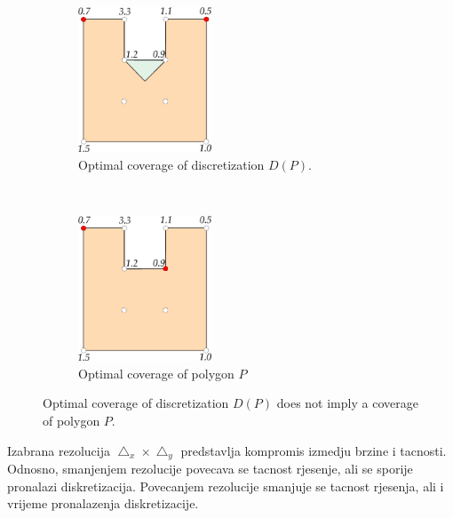 \documentclass[runningheads,a4paper]{elsarticle}
\begin{document}
	\begin{figure}[t!]
    	\centering
    	\begin{subfigure}[t]{0.49\textwidth}
        	\centering
        	\includegraphics[height=1.7in]{slika1a.eps}
        	\caption{Optimal coverage of discretization $D(P)$. }
    	\end{subfigure}%
    	~ 
    	\begin{subfigure}[t]{0.49\textwidth}
        	\centering
        	\includegraphics[height=1.7in]{slika1b.eps}
        	\caption{Optimal coverage of polygon $P$}
    	\end{subfigure}
    	\caption{Optimal coverage of discretization $D(P)$ does not imply a coverage of polygon $P$.}
	\end{figure}
	
	Izabrana rezolucija $\bigtriangleup_{x}\times\bigtriangleup_{y}$ predstavlja kompromis izmedju brzine i tacnosti. Odnosno, smanjenjem rezolucije povecava se tacnost rjesenje, ali se sporije pronalazi diskretizacija. Povecanjem rezolucije smanjuje se tacnost rjesenja, ali i vrijeme pronalazenja diskretizacije.
	
	
\end{document}
